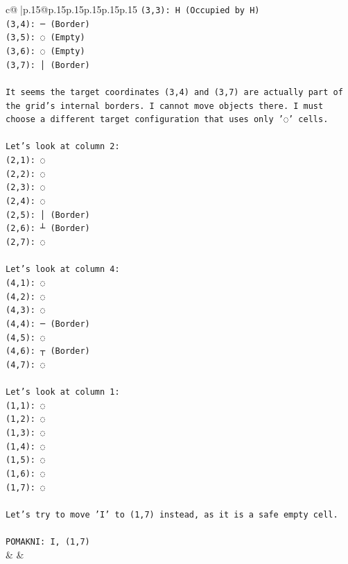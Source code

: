 \documentclass{article}
\begin{document}
{\begin{supertabular}{c@{$\;$}|p{.15\linewidth}@{}p{.15\linewidth}p{.15\linewidth}p{.15\linewidth}p{.15\linewidth}p{.15\linewidth}}
{{{\texttt{(3,3): H (Occupied by H)} \\
\texttt{(3,4): ─ (Border)} \\
\texttt{(3,5): ◌ (Empty)} \\
\texttt{(3,6): ◌ (Empty)} \\
\texttt{(3,7): │ (Border)} \\
\\ 
\texttt{It seems the target coordinates (3,4) and (3,7) are actually part of the grid's internal borders. I cannot move objects there. I must choose a different target configuration that uses only '◌' cells.} \\
\\ 
\texttt{Let's look at column 2:} \\
\texttt{(2,1): ◌} \\
\texttt{(2,2): ◌} \\
\texttt{(2,3): ◌} \\
\texttt{(2,4): ◌} \\
\texttt{(2,5): │ (Border)} \\
\texttt{(2,6): ┴ (Border)} \\
\texttt{(2,7): ◌} \\
\\ 
\texttt{Let's look at column 4:} \\
\texttt{(4,1): ◌} \\
\texttt{(4,2): ◌} \\
\texttt{(4,3): ◌} \\
\texttt{(4,4): ─ (Border)} \\
\texttt{(4,5): ◌} \\
\texttt{(4,6): ┬ (Border)} \\
\texttt{(4,7): ◌} \\
\\ 
\texttt{Let's look at column 1:} \\
\texttt{(1,1): ◌} \\
\texttt{(1,2): ◌} \\
\texttt{(1,3): ◌} \\
\texttt{(1,4): ◌} \\
\texttt{(1,5): ◌} \\
\texttt{(1,6): ◌} \\
\texttt{(1,7): ◌} \\
\\ 
\texttt{Let's try to move 'I' to (1,7) instead, as it is a safe empty cell.} \\
\\ 
\texttt{POMAKNI: I, (1,7)} \\
            }
        }
    }
    & & \\ \\


\end{supertabular}}
\end{document}

